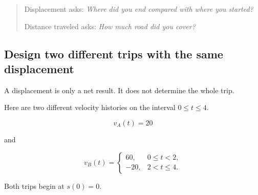 \begin{quote}
Displacement asks: \emph{Where did you end compared with where you started?}

Distance traveled asks: \emph{How much road did you cover?}
\end{quote}

\subsection{Design two different trips with the same displacement}
\label{subsec:same-displacement-project}

A displacement is only a net result. It does not determine the whole trip.

Here are two different velocity histories on the interval \(0\leq t\leq 4\).

\[
v_A(t)=20
\]

and

\[
v_B(t)=
\begin{cases}
60, & 0\leq t<2,\\
-20, & 2<t\leq 4.
\end{cases}
\]

Both trips begin at \(s(0)=0\).

